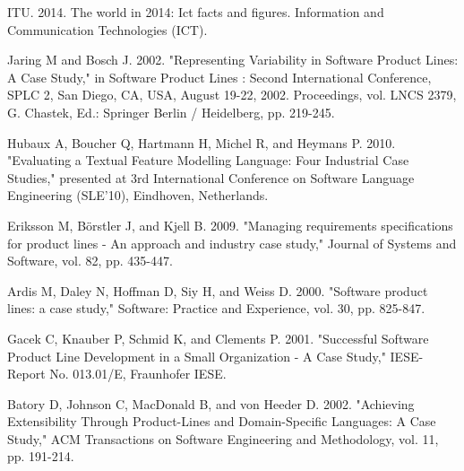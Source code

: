 \documentclass{kais}
\begin{document}
\begin{thebibliography}{99}
 ITU. 2014. The world in 2014: Ict facts and figures. Information and Communication Technologies (ICT).

 Jaring M and Bosch J. 2002. "Representing Variability in Software Product Lines: A Case Study," in Software Product Lines : Second International Conference, SPLC 2, San Diego, CA, USA, August 19-22, 2002. Proceedings, vol. LNCS 2379, G. Chastek, Ed.: Springer Berlin / Heidelberg, pp. 219-245.

 Hubaux A, Boucher Q, Hartmann H, Michel R, and Heymans P. 2010. "Evaluating a Textual Feature Modelling Language: Four Industrial Case Studies," presented at 3rd International Conference on Software Language Engineering (SLE'10), Eindhoven, Netherlands.

 Eriksson M, Börstler J, and Kjell B. 2009. "Managing requirements specifications for product lines - An approach and industry case study," Journal of Systems and Software, vol. 82, pp. 435-447.

 Ardis M, Daley N, Hoffman D, Siy H, and Weiss D. 2000. "Software product lines: a case study," Software: Practice and Experience, vol. 30, pp. 825-847.

 Gacek C, Knauber P, Schmid K, and Clements P. 2001. "Successful Software Product Line Development in a Small Organization - A Case Study," IESE-Report No. 013.01/E, Fraunhofer IESE.

 Batory D, Johnson C, MacDonald B, and von Heeder D. 2002. "Achieving Extensibility Through Product-Lines and Domain-Specific Languages: A Case Study," ACM Transactions on Software Engineering and Methodology, vol. 11, pp. 191-214.

\end{thebibliography}
\end{document}
